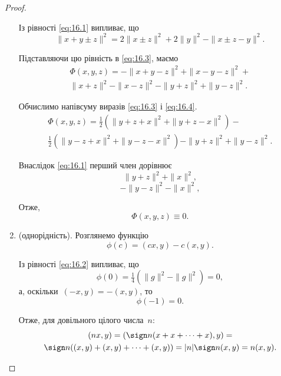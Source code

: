 \begin{proof}
\begin{enumerate}
Із рівності \eqref{eq:16.1} випливає, що
\begin{equation*}
    \|x + y \pm z\|^2 = 2 \|x \pm z\|^2 + 2 \|y\|^2 - \|x \pm z - y\|^2.
\end{equation*}

Підставляючи цю рівність в \eqref{eq:16.3}, маємо
\begin{multline}
    \label{eq:16.4}
    \Phi(x, y, z) = -\|x + y - z\|^2 + \|x - y - z\|^2 + \\
    \|x + z\|^2 - \|x - z\|^2 - \|y + z\|^2 + \|y - z\|^2.
\end{multline}

Обчислимо напівсуму виразів \eqref{eq:16.3} і \eqref{eq:16.4}.
\begin{multline*}
    \Phi(x, y, z) = \tfrac{1}{2} (\|y + z + x\|^2 + \|y + z - x\|^2) - \\
    \tfrac{1}{2} (\|y - z + x\|^2 + \|y - z - x\|^2) - \|y + z\|^2 + \|y - z\|^2.
\end{multline*}

Внаслідок \eqref{eq:16.1} перший член дорівнює
\begin{equation*}
    \|y + z\|^2 + \|x\|^2,
\end{equation*}
\begin{equation*}
    -\|y - z\|^2 - \|x\|^2,
\end{equation*}

Отже,
\begin{equation*}
    \Phi(x, y, z) \equiv 0.
\end{equation*}

\item (однорідність). Розглянемо функцію
\begin{equation*}
    \phi(c) = (c x, y) - c (x, y).
\end{equation*}

Із рівності \eqref{eq:16.2} випливає, що
\begin{equation*}
    \phi(0) = \tfrac{1}{4} (\|g\|^2 - \|g\|^2) = 0,
\end{equation*}
а, оскільки~$(-x, y) = -(x, y)$, то
\begin{equation*}
    \phi(-1) = 0.
\end{equation*}

Отже, для довільного цілого числа~$n$:
\begin{multline*}
    (n x, y) = (\sign n (x + x + \dots + x), y) = \\
    \sign n ((x, y) + (x, y) + \dots + (x, y)) =
    |n| \sign n (x, y) = n (x, y).
\end{multline*}


\end{enumerate}
\end{proof}
